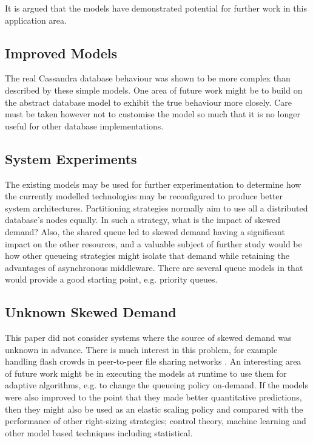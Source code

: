 It is argued that the models have demonstrated potential for further work in this application area.
	
\subsection{Improved Models}

The real Cassandra database behaviour was shown to be more complex than described by these simple models.  One area of future work might be to build on the abstract database model to exhibit the true behaviour more closely.  Care must be taken however not to customise the model so much that it is no longer useful for other database implementations.

\subsection{System Experiments}

The existing models may be used for further experimentation to determine how the currently modelled technologies may be reconfigured to produce better system architectures.  Partitioning strategies normally aim to use all a distributed database's nodes equally.  In such a strategy, what is the impact of skewed demand?  Also, the shared queue led to skewed demand having a significant impact on the other resources, and a valuable subject of further study would be how other queueing strategies might isolate that demand while retaining the advantages of asynchronous middleware.  There are several queue models in \cite{RN75} that would provide a good starting point, e.g. priority queues.

\subsection{Unknown Skewed Demand}
This paper did not consider systems where the source of skewed demand was unknown in advance.  There is much interest in this problem, for example handling flash crowds in peer-to-peer file sharing networks \cite{RN230}.
An interesting area of future work might be in executing the models at runtime to use them for adaptive algorithms, e.g. to change the queueing policy on-demand.  If the models were also improved to the point that they made better quantitative predictions, then they might also be used as an elastic scaling policy and compared with the performance of other right-sizing strategies; control theory, machine learning and other model based techniques including statistical.

